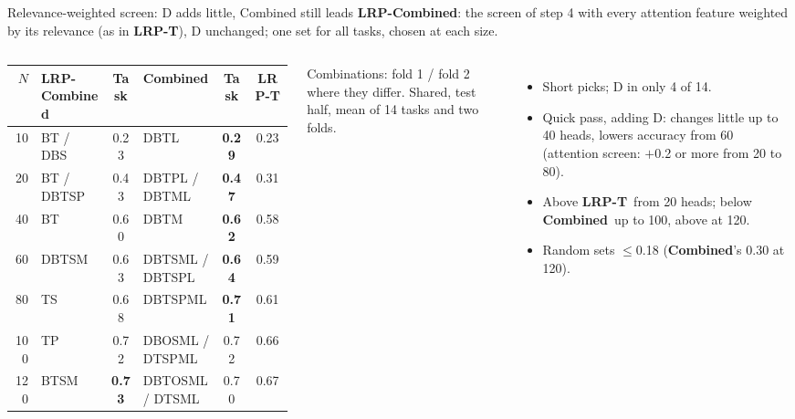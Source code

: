 \documentclass[aspectratio=169,11pt,xcolor=table]{beamer}
\newcommand{\gnote}[1]{{\footnotesize\color{gray}#1}}
\newcommand{\spaced}{\setlength{\itemsep}{0.55em}}
\newcommand{\Sel}{\textcolor{cSel}{\textbf{Combined}}}
\newcommand{\LRPT}{\textcolor{cLRP}{\textbf{LRP-T}}}
\newcommand{\LRPC}{\textcolor{cLRP}{\textbf{LRP-Combined}}}
\begin{document}
\begin{frame}{Relevance-weighted screen: D adds little, Combined still leads}
\textbf{\LRPC}: the screen of step 4 with every attention feature weighted by its relevance (as in \LRPT),
D unchanged; one set for all tasks, chosen at each size.

\vspace{0.5em}
\begin{columns}[T]
\centering\footnotesize\setlength{\tabcolsep}{4pt}
\begin{tabular}{@{}rlclcc@{}}
\toprule
$N$ & \LRPC\ & Task & \Sel & Task & \LRPT \\
\midrule
10 & BT / DBS & 0.23 & DBTL & \textbf{0.29} & 0.23 \\
20 & BT / DBTSP & 0.43 & DBTPL / DBTML & \textbf{0.47} & 0.31 \\
40 & BT & 0.60 & DBTM & \textbf{0.62} & 0.58 \\
60 & DBTSM & 0.63 & DBTSML / DBTSPL & \textbf{0.64} & 0.59 \\
80 & TS & 0.68 & DBTSPML & \textbf{0.71} & 0.61 \\
100 & TP & 0.72 & DBOSML / DTSPML & 0.72 & 0.66 \\
120 & BTSM & \textbf{0.73} & DBTOSML / DTSML & 0.70 & 0.67 \\
\bottomrule
\end{tabular}

\vspace{0.3em}
\gnote{Combinations: fold 1 / fold 2 where they differ. Shared, test half, mean of 14 tasks and two folds.}
\small
\begin{itemize}\spaced
\item Short picks; D in only 4 of 14.
\item Quick pass, adding D: changes little up to 40 heads, lowers accuracy from 60
      (attention screen: $+$0.2 or more from 20 to 80).
\item Above \LRPT\ from 20 heads; below \Sel\ up to 100, above at 120.
\item Random sets $\leq$0.18 (\Sel's 0.30 at 120).
\end{itemize}
\end{columns}
\end{frame}
\end{document}
